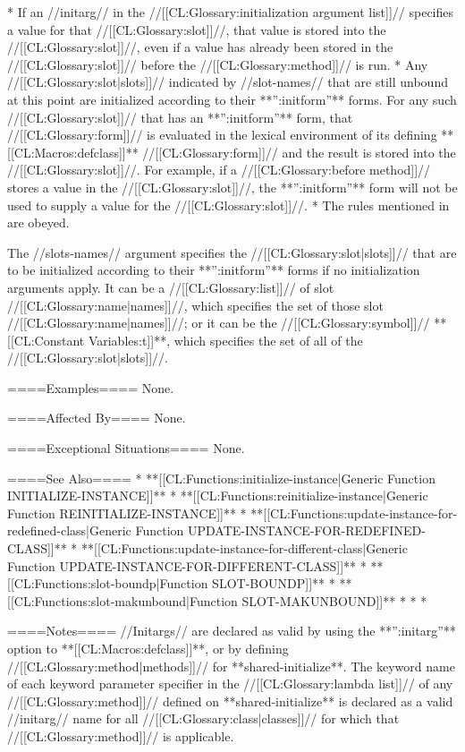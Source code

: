   * If an //initarg// in the //[[CL:Glossary:initialization argument list]]// specifies a value for that //[[CL:Glossary:slot]]//, that value is stored into the //[[CL:Glossary:slot]]//, even if a value has already been stored in the //[[CL:Glossary:slot]]// before the //[[CL:Glossary:method]]// is run.
  * Any //[[CL:Glossary:slot|slots]]// indicated by //slot-names// that are still unbound at this point are initialized according to their **'':initform''** forms. For any such //[[CL:Glossary:slot]]// that has an **'':initform''** form, that //[[CL:Glossary:form]]// is evaluated in the lexical environment of its defining **[[CL:Macros:defclass]]** //[[CL:Glossary:form]]// and the result is stored into the //[[CL:Glossary:slot]]//. For example, if a //[[CL:Glossary:before method]]// stores a value in the //[[CL:Glossary:slot]]//, the **'':initform''** form will not be used to supply a value for the //[[CL:Glossary:slot]]//.
  * The rules mentioned in {\secref\InitargRules} are obeyed.

The //slots-names// argument specifies the //[[CL:Glossary:slot|slots]]// that are to be initialized according to their **'':initform''** forms if no initialization arguments apply. It can be a //[[CL:Glossary:list]]// of slot //[[CL:Glossary:name|names]]//, which specifies the set of those slot //[[CL:Glossary:name|names]]//; or it can be the //[[CL:Glossary:symbol]]// **[[CL:Constant Variables:t]]**, which specifies the set of all of the //[[CL:Glossary:slot|slots]]//.

====Examples====
None.

====Affected By====
None.

====Exceptional Situations====
None.

====See Also====
  * **[[CL:Functions:initialize-instance|Generic Function INITIALIZE-INSTANCE]]**
  * **[[CL:Functions:reinitialize-instance|Generic Function REINITIALIZE-INSTANCE]]**
  * **[[CL:Functions:update-instance-for-redefined-class|Generic Function UPDATE-INSTANCE-FOR-REDEFINED-CLASS]]**
  * **[[CL:Functions:update-instance-for-different-class|Generic Function UPDATE-INSTANCE-FOR-DIFFERENT-CLASS]]**
  * **[[CL:Functions:slot-boundp|Function SLOT-BOUNDP]]**
  * **[[CL:Functions:slot-makunbound|Function SLOT-MAKUNBOUND]]**
  * {\secref\ObjectCreationAndInit}
  * {\secref\InitargRules}
  * {\secref\DeclaringInitargValidity}

====Notes====
//Initargs// are declared as valid by using the **'':initarg''** option to **[[CL:Macros:defclass]]**, or by defining //[[CL:Glossary:method|methods]]// for **shared-initialize**. The keyword name of each keyword parameter specifier in the //[[CL:Glossary:lambda list]]// of any //[[CL:Glossary:method]]// defined on **shared-initialize** is declared as a valid //initarg// name for all //[[CL:Glossary:class|classes]]// for which that //[[CL:Glossary:method]]// is applicable.

